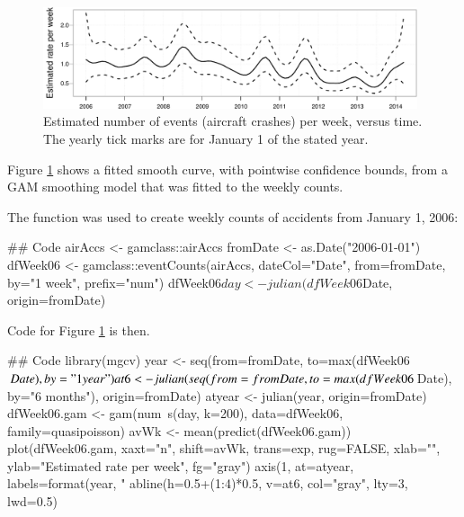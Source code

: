 \begin{fullwidth}
\begin{figure}
\vspace*{-12pt}
\begin{Schunk}


\centerline{\includegraphics[width=0.98\textwidth]{figs/9-plotGAM-byWk-1} }

\end{Schunk}
\vspace*{-6pt}
\caption{Estimated number of events (aircraft crashes) per week,
  versus time.  The yearly tick marks are for January 1 of the
  stated year.\label{fig:planeCrash}}
\end{figure}
\end{fullwidth}

Figure \ref{fig:planeCrash} shows a fitted smooth curve, with
pointwise confidence bounds, from a GAM smoothing model that
was fitted to the weekly counts. 

The function  was used to create
weekly counts of accidents from January 1, 2006:

\begin{Schunk}
\begin{Sinput}
## Code
airAccs <- gamclass::airAccs
fromDate <- as.Date("2006-01-01")
dfWeek06 <- gamclass::eventCounts(airAccs, dateCol="Date",
                                  from=fromDate,
                                by="1 week", prefix="num")
dfWeek06$day <- julian(dfWeek06$Date, origin=fromDate)
\end{Sinput}
\end{Schunk}

Code for Figure \ref{fig:planeCrash} is then.
\begin{fullwidth}

\begin{Schunk}
\begin{Sinput}
## Code
library(mgcv)
year <- seq(from=fromDate, to=max(dfWeek06$Date), by="1 year")
at6 <- julian(seq(from=fromDate, to=max(dfWeek06$Date), by="6 months"), origin=fromDate)
atyear <- julian(year, origin=fromDate)
dfWeek06.gam <- gam(num~s(day, k=200), data=dfWeek06, family=quasipoisson)
avWk <- mean(predict(dfWeek06.gam))
plot(dfWeek06.gam, xaxt="n", shift=avWk, trans=exp, rug=FALSE,
     xlab="", ylab="Estimated rate per week", fg="gray")
axis(1, at=atyear, labels=format(year, "%
abline(h=0.5+(1:4)*0.5, v=at6, col="gray", lty=3, lwd=0.5)
\end{Sinput}
\end{Schunk}

\end{fullwidth}

